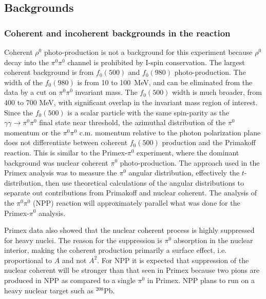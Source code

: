
\subsection{Backgrounds}

\subsubsection{Coherent and incoherent backgrounds in the reaction}

Coherent $\rho^0$ photo-production is not a background for this
experiment because $\rho^0$ decay into the $\pi^0\pi^0$ channel is
prohibited by I-spin conservation.  The largest coherent background is
from $f_0(500)$ and $f_0(980)$ photo-production.  The width of the
$f_0(980)$ is from 10 to 100~MeV, and can be eliminated from the data
by a cut on $\pi^0\pi^0$ invariant mass.  The $f_0(500)$ width is much
broader, from 400 to 700 MeV, with significant overlap in the
invariant mass region of interest.  Since the $f_0(500)$ is a scalar
particle with the same spin-parity as the $\gamma \gamma \rightarrow
\pi^0\pi^0$ final state near threshold, the azimuthal distribution of
the $\pi^0$ momentum or the $\pi^0\pi^0$ c.m. momentum relative to the
photon polarization plane does not differentiate between coherent
$f_0(500)$ production and the Primakoff reaction.  This is similar to
the Primex-$\pi^0$ experiment, where the dominant background was
nuclear coherent $\pi^0$ photo-production.  The approach used in the
Primex analysis was to measure the $\pi^0$ angular distribution,
effectively the $t$-distribution, then use theoretical calculations of
the angular distributions to separate out contributions from Primakoff
and nuclear coherent. The analysis of the $\pi^0\pi^0$ (NPP) reaction
will approximately parallel what was done for the Primex-$\pi^0$
analysis.

Primex data also showed that the nuclear coherent process is highly
suppressed for heavy nuclei.  The reason for the suppression is
$\pi^0$ absorption in the nuclear interior, making the coherent
production primarily a surface effect, i.e. proportional to $A$ and
not $A^2$.  For NPP it is expected that suppression of the nuclear
coherent will be stronger than that seen in Primex because two pions
are produced in NPP as compared to a single $\pi^0$ in Primex.  NPP
plans to run on a heavy nuclear target such as $^{208}$Pb.

